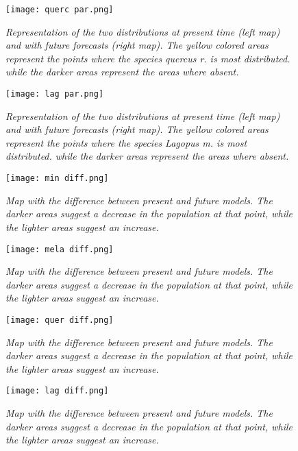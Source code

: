 \documentclass[12pt,a4paper]{article}
\begin{document}
\begin{figure}[H]
\centerline{\texttt{[image: querc par.png]}}
\caption{\textit{Representation of the two distributions at present time (left map) and with future forecasts (right map).
The yellow colored areas represent the points where the species quercus r. is most distributed. while the darker areas represent the areas where absent.}}
\label{querpar}
\end{figure}


\begin{figure}[H]
\centerline{\texttt{[image: lag par.png]}}
\caption{\textit{Representation of the two distributions at present time (left map) and with future forecasts (right map).
The yellow colored areas represent the points where the species Lagopus m. is most distributed. while the darker areas represent the areas where absent.}}
\label{lagpar}
\end{figure}

\begin{figure}[H]
\centerline{\texttt{[image: min diff.png]}}
\caption{\textit{Map with the difference between present and future models. The darker areas suggest a decrease in the population at that point, while the lighter areas suggest an increase.}}
\label{mindiff}
\end{figure}

\begin{figure}[H]
\centerline{\texttt{[image: mela diff.png]}}
\caption{\textit{Map with the difference between present and future models. The darker areas suggest a decrease in the population at that point, while the lighter areas suggest an increase.}}
\label{meladiff}
\end{figure}

\begin{figure}[H]
\centerline{\texttt{[image: quer diff.png]}}
\caption{\textit{Map with the difference between present and future models. The darker areas suggest a decrease in the population at that point, while the lighter areas suggest an increase.}}
\label{querdiff}
\end{figure}

\begin{figure}[H]
\centerline{\texttt{[image: lag diff.png]}}
\caption{\textit{Map with the difference between present and future models. The darker areas suggest a decrease in the population at that point, while the lighter areas suggest an increase.}}
\label{lagdiff}
\end{figure}
\end{document}

